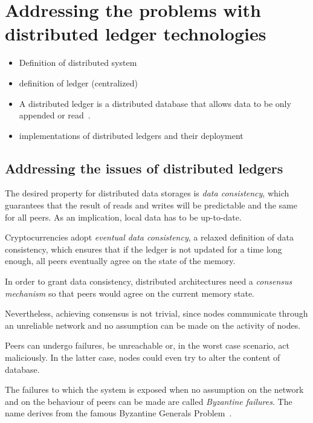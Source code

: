 \chapter{Addressing the problems with distributed ledger technologies}
\label{intro}

\begin{itemize}
	\item Definition of distributed system

	\item definition of ledger (centralized)

	\item A distributed ledger is a distributed database that allows data to be only appended or read~\cite{Sunyaev2020}. 

	\item implementations of distributed ledgers and their deployment
\end{itemize}

\section{Addressing the issues of distributed ledgers}\label{ledgerproblems}
The desired property  for distributed data storages is \emph{data consistency}, which guarantees that the result of reads and writes will be predictable and the same for all peers. As an implication, local data has to be up-to-date.

Cryptocurrencies adopt \emph{eventual data consistency}, a relaxed definition of data consistency, which ensures that if the ledger is not updated for a time long enough, all peers eventually agree on the state of the memory.

In order to grant data consistency, distributed architectures need a \emph{consensus mechanism} so that peers would agree on the current memory state.

Nevertheless, achieving consensus is not trivial, since nodes communicate through an unreliable network and no assumption can be made on the activity of nodes.

Peers can undergo failures, be unreachable or, in the worst case scenario, act maliciously. In the latter case, nodes could even try to alter the content of database.

The failures to which the system is exposed when no assumption on the network and on the behaviour of peers can be made are called \emph{Byzantine failures}. The name derives from the famous Byzantine Generals Problem~\cite{bgp}.

